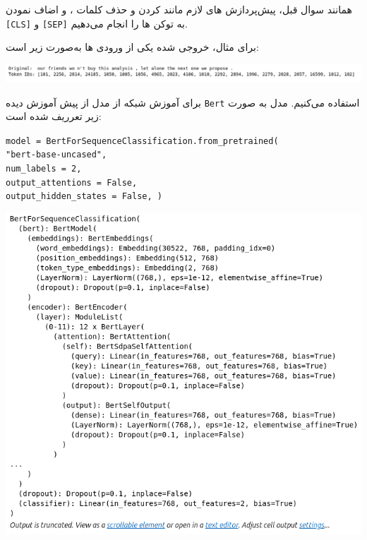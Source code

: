 \begin{qsolve}
		
	همانند سوال قبل، پیش‌پردازش های لازم مانند  کردن و حذف کلمات ، و اضاف نمودن \texttt{[CLS]} و \texttt{[SEP]} به توکن ها را انجام می‌دهیم.
	
	برای مثال، خروجی  شده یکی از ورودی ها به‌صورت زیر است:
	
	\begin{center}
		\includegraphics*[width=0.9\linewidth]{pics/img12.png}
		\label{خروجی توکنایز شده}
	\end{center}
	
	برای آموزش شبکه از مدل از پیش آموزش دیده \texttt{Bert} استفاده می‌کنیم. مدل به صورت زیر تعرریف شده است:
	
	\begin{latin}
		\texttt{model = BertForSequenceClassification.from\_pretrained(}\\
		\texttt{"bert-base-uncased",}\\
		\texttt{num\_labels = 2,}\\
		\texttt{output\_attentions = False,}\\
		\texttt{output\_hidden\_states = False, )}
	\end{latin}
	
	\begin{center}
		\includegraphics*[width=0.9\linewidth]{pics/img13.png}
		\label{معماری مدل}
	\end{center}
\end{qsolve}



